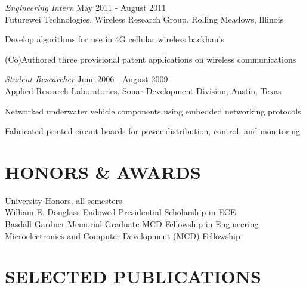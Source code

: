 \documentclass[line,margin=1in]{res}
\begin{document}
\begin{resume}
{\sl Engineering Intern} \hfill May 2011 - August 2011 \\
Futurewei Technologies, Wireless Research Group, Rolling Meadows, Illinois
\begin{compactitem}  
  \item Develop algorithms for use in 4G cellular wireless backhauls
  \item (Co)Authored three provisional patent applications on wireless communications~\cite{truong2011designing,starr2011method,starr2011variable}
\end{compactitem}

{\sl Student Researcher} \hfill June 2006 - August 2009 \\
Applied Research Laboratories, Sonar Development Division, Austin, Texas
\begin{compactitem}
  \item Networked underwater vehicle components using embedded networking protocols
  \item Fabricated printed circuit boards for power distribution, control, and monitoring
\end{compactitem}

\section{HONORS \& AWARDS}
University Honors, all semesters \\
William E. Douglass Endowed Presidential Scholarship in ECE \\
Basdall Gardner Memorial Graduate MCD Fellowship in Engineering \\
Microelectronics and Computer Development (MCD) Fellowship

\section{SELECTED PUBLICATIONS}
\nocite{*}
\renewcommand{\refname}{}


\end{resume}
\end{document}
